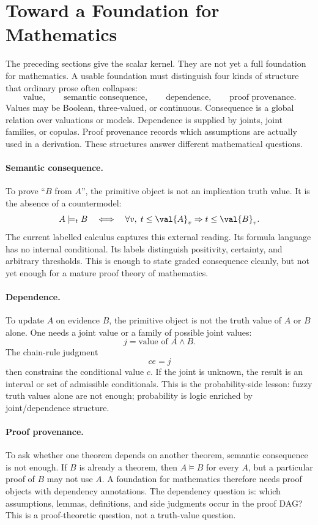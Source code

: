 \section{Toward a Foundation for Mathematics}
\label{sec:foundations-roadmap}

The preceding sections give the scalar kernel.  They are not yet a full
foundation for mathematics.  A usable foundation must distinguish four kinds of
structure that ordinary prose often collapses:
\[
\text{value},\qquad
\text{semantic consequence},\qquad
\text{dependence},\qquad
\text{proof provenance}.
\]
Values may be Boolean, three-valued, or continuous.  Consequence is a global
relation over valuations or models.  Dependence is supplied by joints, joint
families, or copulas.  Proof provenance records which assumptions are actually
used in a derivation.  These structures answer different mathematical questions.

\paragraph{Semantic consequence.}
To prove ``$B$ from $A$'', the primitive object is not an implication truth
value.  It is the absence of a countermodel:
\[
  A\models_t B
  \quad\Longleftrightarrow\quad
  \forall v,\; t\le \val{A}_v \Rightarrow t\le \val{B}_v.
\]
The current labelled calculus captures this external reading.  Its formula
language has no internal conditional.  Its labels distinguish positivity,
certainty, and arbitrary thresholds.  This is enough to state graded consequence
cleanly, but not yet enough for a mature proof theory of mathematics.

\paragraph{Dependence.}
To update $A$ on evidence $B$, the primitive object is not the truth value of
$A$ or $B$ alone.  One needs a joint value or a family of possible joint values:
\[
  j=\text{value of }A\land B.
\]
The chain-rule judgment
\[
  c e=j
\]
then constrains the conditional value $c$.  If the joint is unknown, the result
is an interval or set of admissible conditionals.  This is the probability-side
lesson: fuzzy truth values alone are not enough; probability is logic enriched by
joint/dependence structure.

\paragraph{Proof provenance.}
To ask whether one theorem depends on another theorem, semantic consequence is
not enough.  If $B$ is already a theorem, then $A\models B$ for every $A$, but a
particular proof of $B$ may not use $A$.  A foundation for mathematics therefore
needs proof objects with dependency annotations.  The dependency question is:
which assumptions, lemmas, definitions, and side judgments occur in the proof
DAG?  This is a proof-theoretic question, not a truth-value question.

